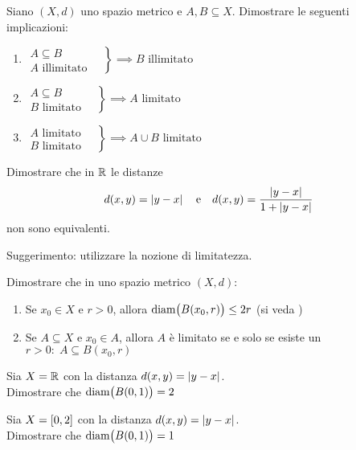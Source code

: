 \begin{exercise}
	Siano $(X,d)$ uno spazio metrico e $A,B\subseteq X$. Dimostrare le seguenti implicazioni:
	\begin{enumerate}
		\item $\left.\begin{array}{ll}
			A \subseteq B\\
			A \text{ illimitato}
			\end{array} \quad\right\} \implies B \text{ illimitato}$
		\item $\left.\begin{array}{ll}
			A \subseteq B\\
			B \text{ limitato}
			\end{array} \quad\right\} \implies A \text{ limitato}$
		\item $\left.\begin{array}{ll}
			A \text{ limitato}\\
			B \text{ limitato}
			\end{array} \quad\right\} \implies  A \cup B \text{ limitato}$
	\end{enumerate}
\end{exercise}
\begin{exercise}
	Dimostrare che in $\mathbb{R}$ le distanze
	$$d(x,y) = \left|y-x\right| \quad \text{e} \quad d(x,y) = \frac{\left|y-x\right|}{1+\left|y-x\right|}$$
	non sono equivalenti.
	\begin{solution}
		Suggerimento: utilizzare la nozione di limitatezza.
	\end{solution}
\end{exercise}
\begin{exercise}
	Dimostrare che in uno spazio metrico $(X,d)$:
	\begin{enumerate}
		\item Se $x_0 \in X$ e $r > 0$, allora $\operatorname{diam} \bigl( B(x_0, r) \bigr) \leq 2r$ (si veda )
		\item Se $A \subseteq X$ e $x_0 \in A$, allora $A$ è limitato se e solo se esiste un $r>0:\; A \subseteq B(x_0,r)$
	\end{enumerate}
\end{exercise}
\begin{exercise}
	Sia $X = \mathbb{R}$ con la distanza $d(x,y) = \left|y-x\right|$.\\
	Dimostrare che $\operatorname{diam} \bigl( B(0,1) \bigr) = 2$
\end{exercise}
\begin{exercise}
	\label{ex:diam_sp_metr}
	Sia $X = \left[0,2\right]$ con la distanza $d(x,y) = \left|y-x\right|$.\\
	Dimostrare che $\operatorname{diam} \bigl( B(0,1) \bigr) = 1$
\end{exercise}


